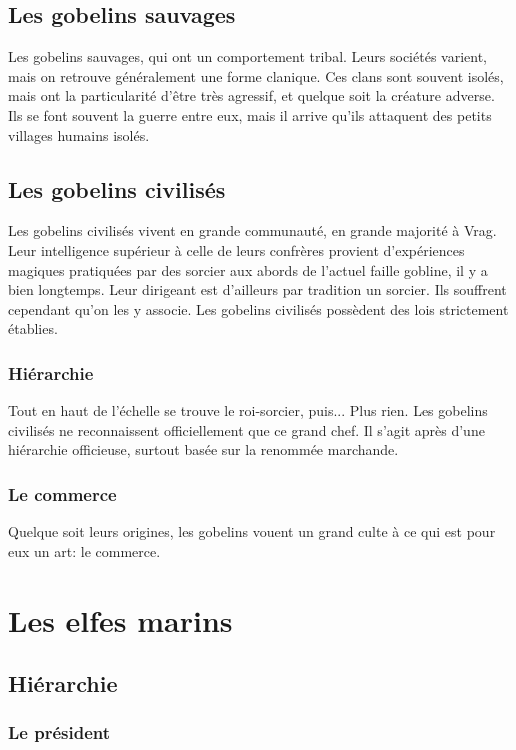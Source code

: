 \subsection{Les gobelins sauvages}
Les gobelins sauvages, qui ont un comportement tribal. Leurs sociétés varient, mais on retrouve généralement une forme clanique. Ces clans sont souvent isolés, mais ont la particularité d'être très agressif, et quelque soit la créature adverse. Ils se font souvent la guerre entre eux, mais il arrive qu'ils attaquent des petits villages humains isolés.
\subsection{Les gobelins civilisés}
Les gobelins civilisés vivent en grande communauté, en grande majorité à Vrag. Leur intelligence supérieur à celle de leurs confrères provient d'expériences magiques pratiquées par des sorcier aux abords de l'actuel faille gobline, il y a bien longtemps. Leur dirigeant est d'ailleurs par tradition un sorcier.
Ils souffrent cependant qu’on les y associe. Les gobelins civilisés possèdent des lois strictement établies.
\subsubsection{Hiérarchie}
Tout en haut de l'échelle se trouve le roi-sorcier, puis... Plus rien. Les gobelins civilisés ne reconnaissent officiellement que ce grand chef. Il s'agit après d'une hiérarchie officieuse, surtout basée sur la renommée marchande.
\subsubsection{Le commerce}
Quelque soit leurs origines, les gobelins vouent un grand culte à ce qui est pour eux un art: le commerce.

\section{Les elfes marins}
\subsection{Hiérarchie}
\subsubsection{Le président}
